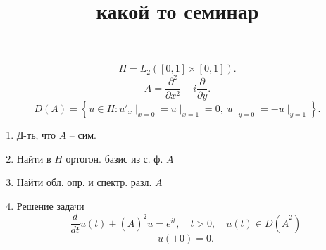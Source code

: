 \documentclass[a4paper]{article}
\title{какой то семинар}
\begin{document}
\maketitle
	\[
	H =L_2 \left( \left[ 0,1 \right] \times [0,1] \right) 
.\] 
\[
	A= \frac{\partial ^2}{\partial x^2} + i \frac{\partial }{\partial y} 
.\] 
\[
	D(A)= \left\{  u \in  H : u'_x \mid _{x=0}=u \mid _{x=1}=0, \; u \mid _{y=0}=-u \mid _{y=1} \right\} 
.\] 
\begin{problem}
	\begin{enumerate}
		\item Д-ть, что $A$ -- сим.
		\item Найти  в $H$ ортогон. базис из с. ф. $A$ 
		\item Найти обл. опр. и спектр. разл. $\overline{A}$ 
		\item Решение задачи
			\[
				\frac{d}{dt}u(t) +\left(\overline{A}\right)^2 u= e^{it}, \quad t >0 ,\quad u(t) \in D\left(\overline{A}^2\right)
			\]
			\[
				u(+0)=0
			.\] 
	\end{enumerate}
\end{problem}
\end{document}
